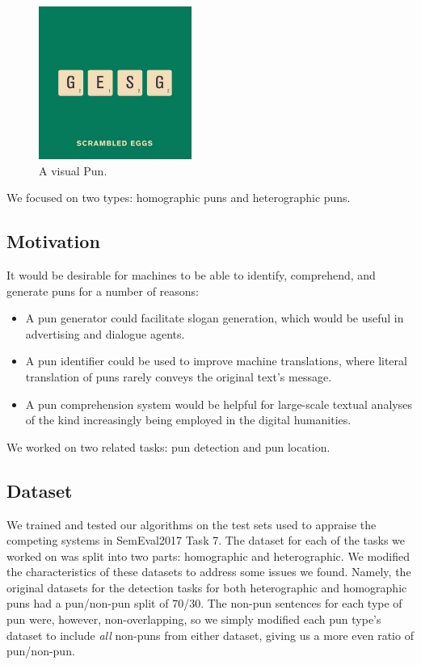 \documentclass{article}
\begin{document}
\begin{figure}
\centering
\includegraphics[width=5cm]{figures/visual_pun.jpg}
\caption{A visual Pun.}\label{fig:visual_pun}
\end{figure}

We focused on two types: homographic puns and heterographic puns. 

\subsection{Motivation}

It would be desirable for machines to be able to identify, comprehend, and
generate puns for a number of reasons:

\begin{itemize}
	\item A pun generator could facilitate slogan generation, which would be
		useful in advertising and dialogue agents.
	\item A pun identifier could be used to improve machine translations, where
		literal translation of puns rarely conveys the original text's message.
	\item A pun comprehension system would be helpful for large-scale textual
		analyses of the kind increasingly being employed in the digital
		humanities.
\end{itemize}

We worked on two related tasks: pun detection and pun location.

\subsection{Dataset}

We trained and tested our algorithms on the test sets used to appraise the
competing systems in SemEval2017 Task 7. The dataset for each of the tasks we
worked on was split into two parts: homographic and heterographic. We modified
the characteristics of these datasets to address some issues we found. Namely,
the original datasets for the detection tasks for both heterographic and
homographic puns had a pun/non-pun split of 70/30. The non-pun sentences for
each type of pun were, however, non-overlapping, so we simply modified each pun
type's dataset to include \emph{all} non-puns from either dataset, giving us a
more even ratio of pun/non-pun.\ 
\end{document}
